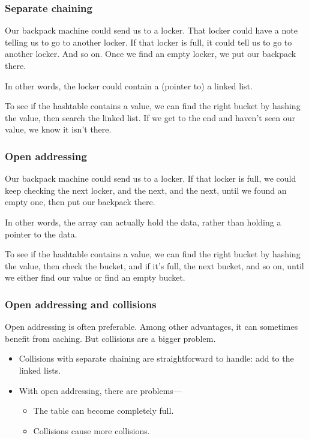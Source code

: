 \documentclass{beamer}
\begin{document}
\begin{frame}
    \frametitle{Separate chaining}

    Our backpack machine could send us to a locker. That locker could have a
    note telling us to go to another locker. If that locker is full, it could
    tell us to go to another locker. And so on. Once we find an empty locker,
    we put our backpack there.


    \vspace{1em}

    In other words, the locker could contain a (pointer to) a linked list.

    \vspace{1em}

    To see if the hashtable contains a value, we can find the right bucket by
    hashing the value, then search the linked list. If we get to the end and
    haven't seen our value, we know it isn't there.
\end{frame}

\begin{frame}
    \frametitle{Open addressing}

    Our backpack machine could send us to a locker. If that locker is full,
    we could keep checking the next locker, and the next, and the next, until
    we found an empty one, then put our backpack there.

    \vspace{1em}

    In other words, the array can actually hold the data, rather than holding
    a pointer to the data.

    \vspace{1em}

    To see if the hashtable contains a value, we can find the right bucket by
    hashing the value, then check the bucket, and if it's full, the next
    bucket, and so on, until we either find our value or find an empty
    bucket.
\end{frame}

\begin{frame}
    \frametitle{Open addressing and collisions}

    Open addressing is often preferable. Among other advantages, it can
    sometimes benefit from caching. But collisions are a bigger problem.

    \vspace{1em}

    \begin{itemize}
        \item Collisions with separate chaining are straightforward to
              handle: add to the linked lists.
        \item With open addressing, there are problems---
        \begin{itemize}
            \item The table can become completely full.
            \item Collisions cause more collisions.
        \end{itemize}
    \end{itemize}
\end{frame}
\end{document}
